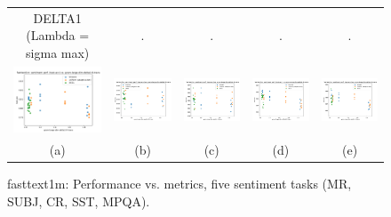 \begin{figure}
\begin{tabular}{@{\hskip -0.0in}c@{\hskip -0.0in}c@{\hskip -0.0in}c@{\hskip -0.0in}c@{\hskip -0.0in}c@{\hskip -0.0in}}
		DELTA1 (Lambda = sigma max) & . & . & . & .\\
		\includegraphics[width=.2\linewidth]{figures/fasttext1m_sentiment_mr_test-acc_vs_gram-large-dim-delta1-6-trans_linx.pdf} &
		\includegraphics[width=.2\linewidth]{figures/fasttext1m_sentiment_subj_test-acc_vs_gram-large-dim-delta1-6-trans_linx.pdf} &
		\includegraphics[width=.2\linewidth]{figures/fasttext1m_sentiment_cr_test-acc_vs_gram-large-dim-delta1-6-trans_linx.pdf} &
		\includegraphics[width=.2\linewidth]{figures/fasttext1m_sentiment_sst_test-acc_vs_gram-large-dim-delta1-6-trans_linx.pdf} &
		\includegraphics[width=.2\linewidth]{figures/fasttext1m_sentiment_mpqa_test-acc_vs_gram-large-dim-delta1-6-trans_linx.pdf} \\	
		\;\;\;\;\;(a) & \;\;\;\;\;\;(b) & \;\;\;\;\;\;(c) & \;\;\;\;\;\;(d) & \;\;\;\;\;\;(e)
	\end{tabular}
	\caption{fasttext1m: Performance vs. metrics, five sentiment tasks (MR, SUBJ, CR, SST, MPQA).
	}
	\label{fig:fastext1m_sent_comparison_results}
\end{figure}
